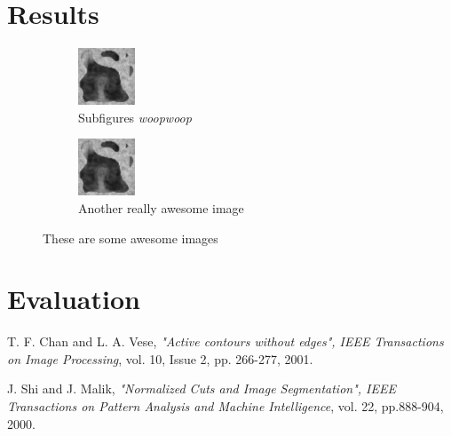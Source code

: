 \documentclass{article}
\begin{document}
  \section{Results}
  {
  \begin{figure}[h]
          \centering
    \begin{subfigure}[t]{0.45\linewidth}
      \centering
      \includegraphics{test.png}
      \caption{Subfigures \textit{woopwoop}}
    \end{subfigure}
    \hfill
    \begin{subfigure}[t]{0.45\linewidth}
      \centering
      \includegraphics{test.png}
      \caption{Another really awesome image}
    \end{subfigure}
    \caption{These are some awesome images}
  \end{figure}
  }
  \pagebreak
  \section{Evaluation}
  
  
	\begin{thebibliography}{9}
	
	\bibitem{[ChanVese01]}
	T. F. Chan and L. A. Vese,
	\emph{"Active contours without edges", IEEE Transactions on Image Processing},
	vol. 10, Issue 2, pp. 266-277, 2001.
	
	
	\bibitem{[ShiMalik00]}
	J.  Shi  and  J.  Malik,
	\emph{"Normalized Cuts and Image Segmentation", IEEE Transactions on Pattern Analysis and Machine Intelligence},
	vol. 22, pp.888-904,
	2000.
	
	\end{thebibliography}
\end{document}
